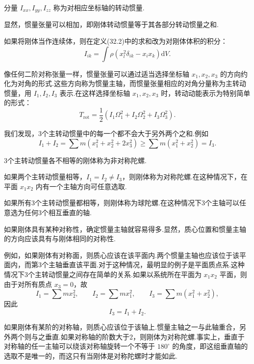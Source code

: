 分量 $I_{xx},I_{yy},I_{zz}$ 称为对相应坐标轴的转动惯量.

显然，惯量张量可以相加，即刚体转动惯量等于其各部分转动惯量之和.

如果将刚体当作连续体，则在定义(32.2)中的求和改为对刚体体积的积分：
\begin{equation}
  I_{ik}=\int\rho\left(x_l^2\delta_{ik}-x_i x_k\right)\mathrm{d}V.
\end{equation}

像任何二阶对称张量一样，惯量张量可以通过适当选择坐标轴 $x_1,x_2,x_3$ 的方向约化为对角的形式.这些方向称为惯量主轴，而惯量张量相应的对角分量称为主转动惯量，用 $I_1,I_2,I_3$ 表示.在这样选择坐标轴 $x_1,x_2,x_3$ 时，转动动能表示为特别简单的形式：
\begin{equation}
  T_{\mathrm{rot}}=\frac{1}{2}\left(I_1\Omega_1^2+I_2\Omega_2^2+I_3\Omega_3^2\right).
\end{equation}

我们发现，3个主转动惯量中的每一个都不会大于另外两个之和.例如
\begin{equation}
  I_1+I_2=\sum m\left(x_1^2+x_2^2+2x_3^2\right)
  \geqslant\sum m\left(x_1^2+x_2^2\right)=I_3.
\end{equation}

3个主转动惯量各不相等的刚体称为非对称陀螺.

如果两个主转动惯量相等，$I_1=I_2\neq I_3$，则刚体称为对称陀螺.在这种情况下，在平面 $x_1x_2$ 内有一个主轴方向可任意选取.

如果所有3个主转动惯量都相等，则刚体称为球陀螺.在这种情况下3个主轴可以任意选为任何3个相互垂直的轴.

如果刚体具有某种对称性，确定惯量主轴就容易得多.显然，质心位置和惯量主轴的方向应该具有与刚体相同的对称性.

例如，如果刚体有对称面，则质心应该在该平面内.两个惯量主轴也应该位于该平面内，而第3个主轴垂直该平面.对于这种情况，最明显的例子是平面质点系.这种情况下3个主转动惯量之间存在简单的关系.如果以系统所在平面为 $x_1x_2$ 平面，则由于对所有质点 $x_3=0$，故
\begin{equation*}
  I_1=\sum m x_2^2,\qquad
  I_2=\sum m x_1^2,\qquad
  I_3=\sum m\left(x_1^2+x_2^2\right),
\end{equation*}
因此
\begin{equation}
  I_3=I_1+I_2.
\end{equation}

如果刚体有某阶的对称轴，则质心应该位于该轴上.惯量主轴之一与此轴重合，另外两个则与之垂直.如果对称轴的阶数大于2，则刚体为对称陀螺.事实上，垂直于对称轴的任一主轴可以绕该对称轴旋转一个不等于 $180^\circ$ 的角度，即这组垂直轴的选取不是唯一的，而这只有当刚体是对称陀螺时才能如此.

